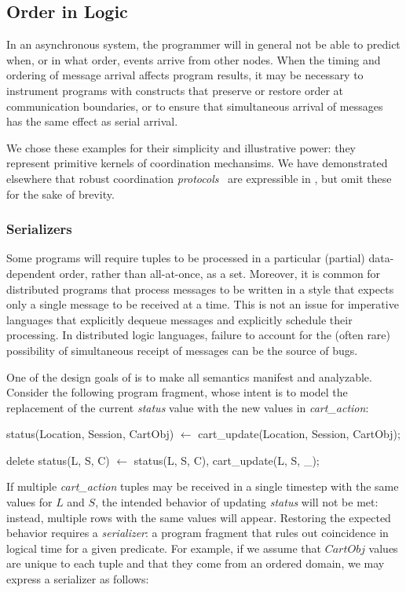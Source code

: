 \subsection{Order in Logic}
\label{sec:orderinlogic}


\noindent{}In an asynchronous system, the programmer will in general not be able to
predict when, or in what order, events arrive from other nodes.  When the timing and 
ordering of message arrival affects program results, it may be necessary to instrument
programs with constructs that preserve or restore order at communication boundaries,
or to ensure that simultaneous arrival of messages has the same effect as serial arrival.

We chose these examples for their simplicity and illustrative power: they represent primitive
kernels of coordination mechansims.  We have demonstrated elsewhere that robust coordination  {\em protocols}~\cite{netdb, dedalus-techr} are expressible in \lang, but omit these for 
the sake of brevity.

\subsubsection{Serializers}

Some programs will require tuples to be processed in a particular (partial)
data-dependent order, rather than all-at-once, as a set.  Moreover, it is 
common for distributed programs that process messages to be written in
a style that expects only a single message to be received at a time.   This 
is not an issue for imperative languages that explicitly dequeue messages and explicitly schedule their processing.  In distributed logic languages,
failure to account for the (often rare) possibility of simultaneous receipt of messages
can be the source of bugs.

One of the design goals of \lang is to make all semantics manifest and analyzable.
Consider the following program fragment, whose intent is to model the replacement of the 
current {\em status} value with the new values in {\em cart\_action}:

\begin{Dedalus}
status(Location, Session, CartObj) \(\leftarrow\)
    cart_update(Location,  Session, CartObj);
    
delete status(L, S, C) \(\leftarrow\)
    status(L, S, C), cart_update(L, S, _);
\end{Dedalus}

If multiple {\em cart\_action} tuples may be received in a single timestep with the same
values for $L$ and $S$, the intended behavior of updating {\em status} will not be met:
instead, multiple rows with the same values will appear.  Restoring the expected behavior
requires a \emph{serializer}: a program fragment that rules out coincidence in logical time 
for a given predicate.  For example, if we assume that $CartObj$ values are unique to each
tuple and that they come from an ordered domain, we may express a serializer as follows:

